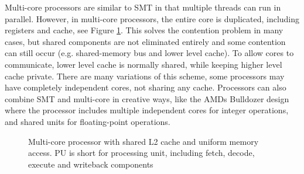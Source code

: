 \documentclass[12pt,a4paper,twoside]{report}
\begin{document}
{	Multi-core processors are similar to SMT in that multiple threads
	can run in parallel. However, in multi-core processors, the entire
	core is duplicated, including registers and cache, see Figure \ref{fig:multi-core-arch}.
	This solves the contention problem in many cases, but shared
	components are not eliminated entirely and some contention can
	still occur (e.g. shared-memory bus and lower level cache).  To
	allow cores to communicate, lower level cache is normally shared,
	while keeping higher level cache private. There are many
	variations of this scheme, some processors may have completely
	independent cores, not sharing any cache. Processors can also
	combine SMT and multi-core in creative ways, like the AMDs
	Bulldozer design where the processor includes multiple
	independent cores for integer operations, and shared units for
	floating-point operations.

	\begin{figure}[H]
		\centering
		\caption{Multi-core processor with shared L2 cache and uniform memory
		access. PU is short for processing unit, including fetch, decode,
		execute and writeback components}
		\label{fig:multi-core-arch}
	\end{figure}

}
\end{document}
